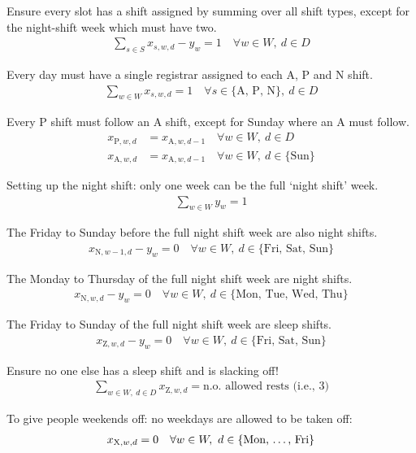 \documentclass[a4paper]{article}
\begin{document}
Ensure every slot has a shift assigned by summing over all shift types, except for the night-shift week which must have two.
\begin{align}
  \sum_{s\in S} x_{s, w, d} - y_w = 1 \quad\forall w\in W,\ d\in D
\end{align}

Every day must have a single registrar assigned to each A, P and N shift.
\begin{align}
  \sum_{w\in W} x_{s, w, d} = 1 \quad\forall s\in \{\text{A, P, N}\},\ d\in D
\end{align}

Every P shift must follow an A shift, except for Sunday where an A must follow.
\begin{align}
  x_{\text{P}, w, d} &= x_{\text{A}, w, d-1} \quad\forall w\in W,\ d\in D\\
  x_{\text{A}, w, d} &= x_{\text{A}, w, d-1} \quad\forall w\in W,\ d\in \{\text{Sun}\}
\end{align}

Setting up the night shift: only one week can be the full `night shift' week.
\begin{align}
  \sum_{w\in W} y_w = 1
\end{align}

The Friday to Sunday before the full night shift week are also night shifts.
\begin{align}
  x_{\text{N}, w-1, d} - y_w = 0 \quad\forall w\in W,\ d\in \{\text{Fri, Sat, Sun}\}
\end{align}

The Monday to Thursday of the full night shift week are night shifts.
\begin{align}
  x_{\text{N}, w, d} - y_w = 0 \quad\forall w\in W,\ d\in \{\text{Mon, Tue, Wed, Thu}\}
\end{align}

The Friday to Sunday of the full night shift week are sleep shifts.
\begin{align}
  x_{\text{Z}, w, d} - y_w = 0 \quad\forall w\in W,\ d\in \{\text{Fri, Sat, Sun}\}
\end{align}

Ensure no one else has a sleep shift and is slacking off!
\begin{align}
  \sum_{w\in W,\ d\in D} x_{\text{Z}, w, d} = \text{n.o. allowed rests (i.e., 3)}
\end{align}

To give people weekends off: no weekdays are allowed to be taken off:
\begin{align}
  x_{\text{X}, w, d} = 0 \quad\forall w\in W,\ d\in \{\text{Mon, \dots, Fri}\}
\end{align}
\end{document}
